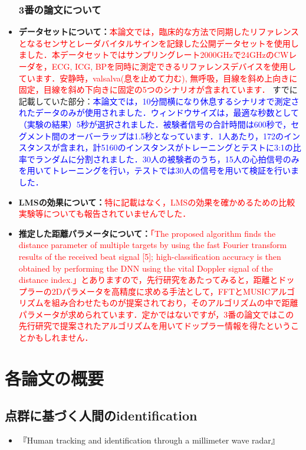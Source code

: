 \documentclass[dvipdfmx]{jsarticle}
\begin{document}
\begin{itemize}
    \subsubsection*{3番の論文について}
    \item \textbf{データセットについて：}\textcolor{red}{本論文では，臨床的な方法で同期したリファレンスとなるセンサとレーダバイタルサインを記録した公開データセット\cite{dataset}を使用しました．本データセットではサンプリングレート2000GHzで24GHzのCWレーダを，ECG, ICG, BPを同時に測定できるリファレンスデバイスを使用しています．安静時，valsalva(息を止めて力む), 無呼吸，目線を斜め上向きに固定，目線を斜め下向きに固定の5つのシナリオが含まれています．}
    すでに記載していた部分：\textcolor{blue}{本論文では，10分間横になり休息するシナリオで測定されたデータのみが使用されました．ウィンドウサイズは，最適な秒数として（実験の結果）5秒が選択されました．被験者信号の合計時間は600秒で，セグメント間のオーバーラップは1.5秒となっています．1人あたり，172のインスタンスが含まれ，計5160のインスタンスがトレーニングとテストに3:1の比率でランダムに分割されました．30人の被験者のうち，15人の心拍信号のみを用いてトレーニングを行い，テストでは30人の信号を用いて検証を行いました．}

    \item \textbf{LMSの効果について：}\textcolor{red}{特に記載はなく，LMSの効果を確かめるための比較実験等についても報告されていませんでした．}
    \item \textbf{推定した距離パラメータについて：}\textcolor{red}{「The proposed algorithm finds the distance parameter of multiple targets by using the fast Fourier transform results of the received beat signal [5]; high-classification accuracy is then obtained by performing the DNN using the vital Doppler signal of the distance index.」とありますので，先行研究\cite{fft-music}をあたってみると，距離とドップラーの2Dパラメータを高精度に求める手法として，FFTとMUSICアルゴリズムを組み合わせたものが提案されており，そのアルゴリズムの中で距離パラメータが求められています．定かではないですが，3番の論文ではこの先行研究で提案されたアルゴリズムを用いてドップラー情報を得たということかもしれません．}
\end{itemize}

\section{各論文の概要}
\subsection{点群に基づく人間のidentification}
\begin{itemize}
    \item 『Human tracking and identification through a millimeter wave radar\cite{pointcloud}』
\end{itemize}
\end{document}
